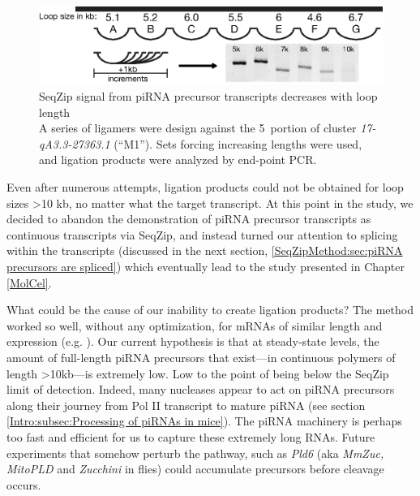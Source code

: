     \begin{figure} %
      \centering
      \includegraphics{Figures/SeqZipMethod/piRNAprecusorM1SignalDecreasesWithLoopLength.eps}
      \caption[SeqZip signal from piRNA precursor transcripts decreases with loop length]
      {
        SeqZip signal from piRNA precursor transcripts decreases with loop length\\[0.25cm]
        A series of ligamers were design against the 5\textprime~portion of cluster \textit{17-qA3.3-27363.1} (``M1''). Sets forcing increasing lengths were used, and ligation products were analyzed by end-point PCR.
        }
      \label{SeqZipMethod:fig:piRNA precusors and loop length}
      \end{figure}

    Even after numerous attempts, ligation products could not be obtained for loop sizes >10 kb, no matter what the target transcript. At this point in the study, we decided to abandon the demonstration of piRNA precursor transcripts as continuous transcripts via SeqZip, and instead turned our attention to splicing within the transcripts (discussed in the next section, \ref{SeqZipMethod:sec:piRNA precursors are spliced}) which eventually lead to the study presented in Chapter \ref{MolCel}.

    What could be the cause of our inability to create ligation products? The method worked so well, without any optimization, for mRNAs of similar length and expression (e.g. \dst{}). Our current hypothesis is that at steady-state levels, the amount of full-length piRNA precursors that exist---in continuous polymers of length >10kb---is extremely low. Low to the point of being below the SeqZip limit of detection. Indeed, many nucleases appear to act on piRNA precursors along their journey from Pol II transcript to mature piRNA (see section \ref{Intro:subsec:Processing of piRNAs in mice}). The piRNA machinery is perhaps too fast and efficient for us to capture these extremely long RNAs. Future experiments that somehow perturb the pathway, such as \textit{Pld6} (aka \textit{MmZuc, MitoPLD} and \textit{Zucchini} in flies) could accumulate precursors before cleavage occurs.

